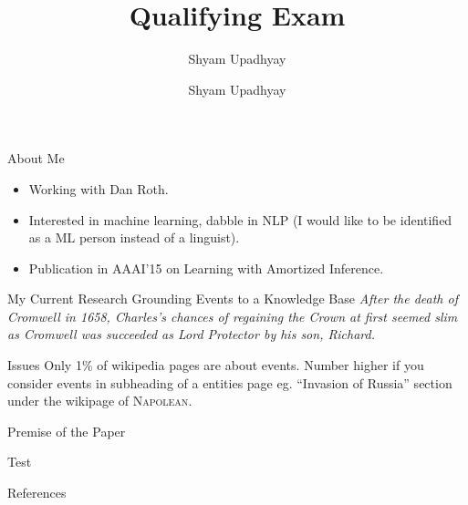 

\author{Shyam Upadhyay}
\title{Qualifying Exam}

\date{Shyam Upadhyay} 



\begin{frame}
\titlepage
\end{frame}

\begin{frame}{About Me}
\begin{itemize}
\item Working with Dan Roth.
\item Interested in machine learning, dabble in NLP (I would like to be identified as a ML person instead of a linguist).
\item Publication in AAAI'15 on Learning with Amortized Inference.
\end{itemize}
\end{frame}

\begin{frame}{My Current Research}
Grounding Events to a Knowledge Base
\emph{After the death of Cromwell in 1658, Charles's chances of regaining the Crown at first seemed slim as Cromwell was succeeded as Lord Protector by his son, Richard.}

\end{frame}

\begin{frame}{Issues}
Only 1\% of wikipedia pages are about events.
Number higher if you consider events in subheading of a entities page eg. ``Invasion of Russia'' section under the wikipage of \textsc{Napolean}.
\end{frame}

\begin{frame}{Premise of the Paper}
  \begin{example}
    Test
  \end{example}
\end{frame}






\begin{frame}[allowframebreaks]{References}
  \def\newblock{}
  
  
\end{frame}


